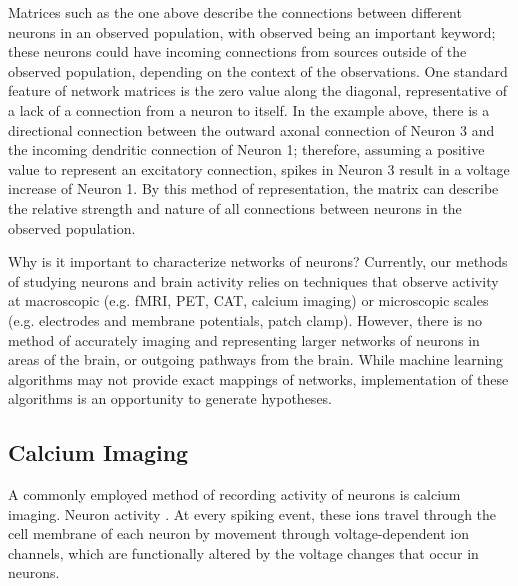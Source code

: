 \documentclass[11pt]{article}
\begin{document}
Matrices such as the one above describe the connections between different neurons in an observed population, with observed being an important keyword; these neurons could have incoming connections from sources outside of the observed population, depending on the context of the observations. One standard feature of network matrices is the zero value along the diagonal, representative of a lack of a connection from a neuron to itself. In the example above, there is a directional connection between the outward axonal connection of Neuron 3 and the incoming dendritic connection of Neuron 1; therefore, assuming a positive value to represent an excitatory connection, spikes in Neuron 3 result in a voltage increase of Neuron 1. By this method of representation, the matrix can describe the relative strength and nature of all connections between neurons in the observed population.\par

Why is it important to characterize networks of neurons? Currently, our methods of studying neurons and brain activity relies on techniques that observe activity at macroscopic (e.g. fMRI, PET, CAT, calcium imaging) or microscopic scales (e.g. electrodes and membrane potentials, patch clamp). However, there is no method of accurately imaging and representing larger networks of neurons in areas of the brain, or outgoing pathways from the brain. While machine learning algorithms may not provide exact mappings of networks, implementation of these algorithms is an opportunity to generate hypotheses.\par

\subsection{Calcium Imaging}
A commonly employed method of recording activity of neurons is calcium imaging. Neuron activity . At every spiking event, these ions travel through the cell membrane of each neuron by movement through voltage-dependent ion channels, which are functionally altered by the voltage changes that occur in neurons.\par
\end{document}
